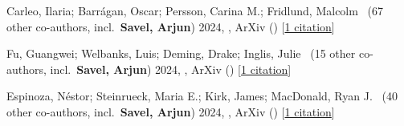 \item[{\color{numcolor}\scriptsize3}] Carleo, Ilaria; Barr{\'a}gan, Oscar; Persson, Carina M.; Fridlund, Malcolm \etal\ ({67} other co-authors, incl.\ \textbf{Savel, Arjun}) 2024, , ArXiv () [\href{https://ui.adsabs.harvard.edu/abs/2024arXiv240805612C}{1 citation}]

\item[{\color{numcolor}\scriptsize2}] Fu, Guangwei; Welbanks, Luis; Deming, Drake; Inglis, Julie \etal\ ({15} other co-authors, incl.\ \textbf{Savel, Arjun}) 2024, , ArXiv () [\href{https://ui.adsabs.harvard.edu/abs/2024arXiv240706163F}{1 citation}]

\item[{\color{numcolor}\scriptsize1}] Espinoza, N{\'e}stor; Steinrueck, Maria E.; Kirk, James; MacDonald, Ryan J. \etal\ ({40} other co-authors, incl.\ \textbf{Savel, Arjun}) 2024, , ArXiv () [\href{https://ui.adsabs.harvard.edu/abs/2024arXiv240710294E}{1 citation}]